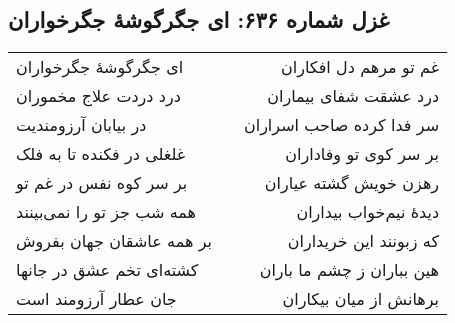 \begin{center}
\section*{غزل شماره ۶۳۶: ای جگرگوشهٔ جگرخواران}
\label{sec:636}
\begin{longtable}{l p{0.5cm} r}
ای جگرگوشهٔ جگرخواران
&&
غم تو مرهم دل افکاران
\\
درد دردت علاج مخموران
&&
درد عشقت شفای بیماران
\\
در بیابان آرزومندیت
&&
سر فدا کرده صاحب اسراران
\\
غلغلی در فکنده تا به فلک
&&
بر سر کوی تو وفاداران
\\
بر سر کوه نفس در غم تو
&&
رهزن خویش گشته عیاران
\\
همه شب جز تو را نمی‌بینند
&&
دیدهٔ نیم‌خواب بیداران
\\
بر همه عاشقان جهان بفروش
&&
که زبونند این خریداران
\\
کشته‌ای تخم عشق در جانها
&&
هین بباران ز چشم ما باران
\\
جان عطار آرزومند است
&&
برهانش از میان بیکاران
\\
\end{longtable}
\end{center}
